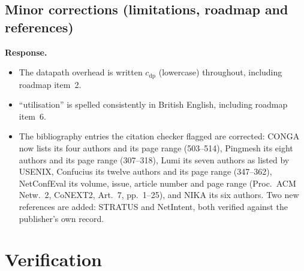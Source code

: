 \documentclass[11pt,a4paper]{article}
\newenvironment{response}{\par\noindent\begin{minipage}{\linewidth}\small\textbf{Response.}\par}{\end{minipage}\medskip\par}
\begin{document}
\subsection{Minor corrections (limitations, roadmap and references)}

\begin{response}
\begin{itemize}
  \item The datapath overhead is written $c_{\mathrm{dp}}$ (lowercase)
    throughout, including roadmap item~2.
  \item ``utilisation'' is spelled consistently in British English, including
    roadmap item~6.
  \item The bibliography entries the citation checker flagged are
    corrected: CONGA now lists its four authors and its page range
    (503--514), Pingmesh its eight authors and its page range (307--318),
    Lumi its seven authors as listed by USENIX, Confucius its twelve
    authors and its page range (347--362), NetConfEval its volume, issue,
    article number and page range (Proc.\ ACM Netw.\ 2, CoNEXT2, Art.\ 7,
    pp.~1--25), and NIKA its six authors. Two new references are added:
    STRATUS and NetIntent, both verified against the publisher's own
    record.
\end{itemize}
\end{response}

\section{Verification}
\end{document}

